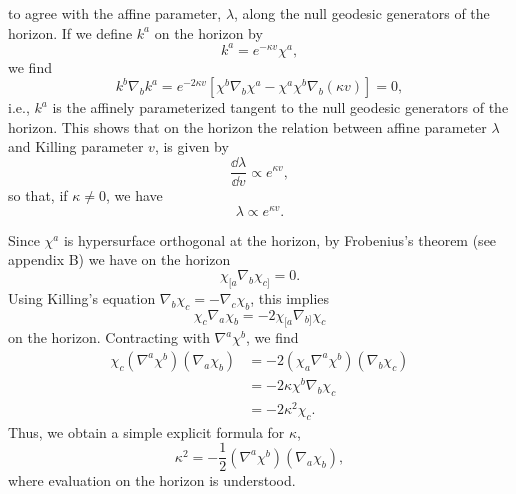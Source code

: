 to agree with the affine parameter, \(\lambda\), along the null geodesic generators
of the horizon. If we define \(k^a\) on the horizon by
\begin{equation}
 k^a=e^{-\kappa v}\chi^a ,
 \tag{12.5.7}\label{eq:12.5.7}
\end{equation}
we find
\begin{equation}
 k^b\nabla_bk^a=e^{-2\kappa v}
 \left[\chi^b\nabla_b\chi^a-\chi^a\chi^b\nabla_b(\kappa v)\right]=0 ,
 \tag{12.5.8}\label{eq:12.5.8}
\end{equation}
i.e., \(k^a\) is the affinely parameterized tangent to the null geodesic generators
of the horizon. This shows that on the horizon the relation between affine parameter
\(\lambda\) and Killing parameter \(v\), is given by
\begin{equation}
 \frac{\dd\lambda}{\dd v}\mathrel{\propto}e^{\kappa v} ,
 \tag{12.5.9}\label{eq:12.5.9}
\end{equation}
so that, if \(\kappa\ne0\), we have
\begin{equation}
 \lambda\mathrel{\propto}e^{\kappa v} .
 \tag{12.5.10}\label{eq:12.5.10}
\end{equation}

Since \(\chi^a\) is hypersurface orthogonal at the horizon, by Frobenius's theorem
(see appendix B) we have on the horizon
\begin{equation}
 \chi_{[a}\nabla_b\chi_{c]}=0 .
 \tag{12.5.11}\label{eq:12.5.11}
\end{equation}
Using Killing's equation \(\nabla_b\chi_c=-\nabla_c\chi_b\), this implies
\begin{equation}
 \chi_c\nabla_a\chi_b=-2\chi_{[a}\nabla_{b]}\chi_c
 \tag{12.5.12}\label{eq:12.5.12}
\end{equation}
on the horizon. Contracting with \(\nabla^a\chi^b\), we find
\begin{equation}
\begin{aligned}
 \chi_c(\nabla^a\chi^b)(\nabla_a\chi_b)
 &=-2(\chi_a\nabla^a\chi^b)(\nabla_b\chi_c)\\
 &=-2\kappa\chi^b\nabla_b\chi_c\\
 &=-2\kappa^2\chi_c .
\end{aligned}
\tag{12.5.13}\label{eq:12.5.13}
\end{equation}
Thus, we obtain a simple explicit formula for \(\kappa\),
\begin{equation}
 \kappa^2=-\frac12(\nabla^a\chi^b)(\nabla_a\chi_b) ,
 \tag{12.5.14}\label{eq:12.5.14}
\end{equation}
where evaluation on the horizon is understood.

